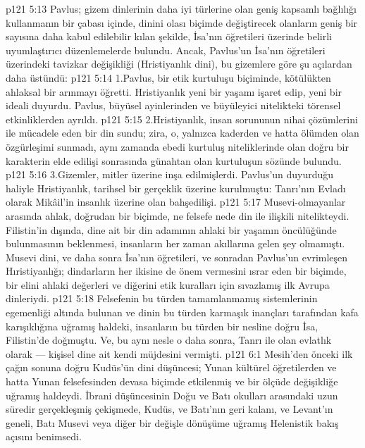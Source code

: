 \vs p121 5:13 Pavlus; gizem dinlerinin daha iyi türlerine olan geniş kapsamlı bağlılığı kullanmanın bir çabası içinde, dinini olası biçimde değiştirecek olanların geniş bir sayısına daha kabul edilebilir kılan şekilde, İsa’nın öğretileri üzerinde belirli uyumlaştırıcı düzenlemelerde bulundu. Ancak, Pavlus’un İsa’nın öğretileri üzerindeki tavizkar değişikliği (Hristiyanlık dini), bu gizemlere göre şu açılardan daha üstündü:
\vs p121 5:14 1.\bibnobreakspace Pavlus, bir etik kurtuluşu biçiminde, kötülükten ahlaksal bir arınmayı öğretti. Hristiyanlık yeni bir yaşamı işaret edip, yeni bir ideali duyurdu. Pavlus, büyüsel ayinlerinden ve büyüleyici nitelikteki törensel etkinliklerden ayrıldı.
\vs p121 5:15 2.\bibnobreakspace Hristiyanlık, insan sorununun nihai çözümlerini ile mücadele eden bir din sundu; zira, o, yalnızca kaderden ve hatta ölümden olan özgürleşimi sunmadı, aynı zamanda ebedi kurtuluş niteliklerinde olan doğru bir karakterin elde edilişi sonrasında günahtan olan kurtuluşun sözünde bulundu.
\vs p121 5:16 3.\bibnobreakspace Gizemler, mitler üzerine inşa edilmişlerdi. Pavlus’un duyurduğu haliyle Hristiyanlık, tarihsel bir gerçeklik üzerine kurulmuştu: Tanrı’nın Evladı olarak Mikâil’in insanlık üzerine olan bahşedilişi.
\vs p121 5:17 Musevi\hyp{}olmayanlar arasında ahlak, doğrudan bir biçimde, ne felsefe nede din ile ilişkili nitelikteydi. Filistin’in dışında, dine ait bir din adamının ahlaki bir yaşamın öncülüğünde bulunmasının beklenmesi, insanların her zaman akıllarına gelen şey olmamıştı. Musevi dini, ve daha sonra İsa’nın öğretileri, ve sonradan Pavlus’un evrimleşen Hıristiyanlığı; dindarların her ikisine de önem vermesini ısrar eden bir biçimde, bir elini ahlaki değerleri ve diğerini etik kuralları için sıvazlamış ilk Avrupa dinleriydi.
\vs p121 5:18 Felsefenin bu türden tamamlanmamış sistemlerinin egemenliği altında bulunan ve dinin bu türden karmaşık inançları tarafından kafa karışıklığına uğramış haldeki, insanların bu türden bir nesline doğru İsa, Filistin’de doğmuştu. Ve, bu aynı nesle o daha sonra, Tanrı ile olan evlatlık olarak --- kişisel dine ait kendi müjdesini vermişti.
\vs p121 6:1 Mesih’den önceki ilk çağın sonuna doğru Kudüs’ün dini düşüncesi; Yunan kültürel öğretilerden ve hatta Yunan felsefesinden devasa biçimde etkilenmiş ve bir ölçüde değişikliğe uğramış haldeydi. İbrani düşüncesinin Doğu ve Batı okulları arasındaki uzun süredir gerçekleşmiş çekişmede, Kudüs, ve Batı’nın geri kalanı, ve Levant’ın geneli, Batı Musevi veya diğer bir değişle dönüşüme uğramış Helenistik bakış açısını benimsedi.

